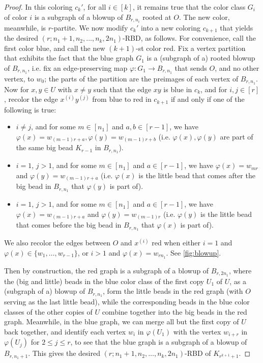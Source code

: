 \documentclass[10pt,a4paper]{amsart}
\numberwithin{theorem}{section}
\renewcommand{\phi}{\varphi}
\renewcommand{\le}{\leqslant}
\begin{document}
\begin{proof}
    In this coloring $c_k'$, for all $i\in [k]$, it remains true that the color class $G_i$ of color $i$ is a subgraph of a blowup of $B_{r,n_i}$ rooted at $O$. The new color, meanwhile, is $r$-partite. We now modify $c_k'$ into a new coloring $c_{k+1}$ that yields the desired $(r;n_1+1,n_2,\dots,n_k,2n_1)$-RBD, as follows. For convenience, call the first color blue, and call the new $(k+1)$-st color red. Fix a vertex partition that exhibits the fact that the blue graph $G_1$ is a (subgraph of a) rooted blowup of $B_{r,n_1}$, i.e. fix an edge-preserving map $\phi: G_1 \to B_{r,n_1}$ that sends $O$, and no other vertex, to $w_0$; the parts of the partition are the preimages of each vertex of $B_{r,n_1}$. Now for $x,y\in U$ with $x\neq y$ such that the edge $xy$ is blue in $c_k$, and for $i,j\in [r]$, recolor the edge $x^{(i)}y^{(j)}$ from blue to red in $c_{k+1}$ if and only if one of the following is true:
    \begin{itemize}
        \item $i\neq j$, and for some $m\in [n_1]$ and $a,b\in [r-1]$, we have $\phi(x)=w_{(m-1)r+a}, \phi(y)=w_{(m-1)r+b}$ (i.e. $\phi(x),\phi(y)$ are part of the same big bead $K_{r-1}$ in $B_{r,n_1}$).
        \item $i=1$, $j>1$, and for some $m\in [n_1]$ and $a\in [r-1]$, we have $\phi(x)=w_{mr}$ and $\phi(y)=w_{(m-1)r+a}$ (i.e. $\phi(x)$ is the little bead that comes after the big bead in $B_{r,n_1}$ that $\phi(y)$ is part of).
        \item $i=1$, $j>1$, and for some $m\in [n_1]$ and $a\in [r-1]$, we have $\phi(x)=w_{(m-1)r+a}$ and $\phi(y)=w_{(m-1)r}$ (i.e. $\phi(y)$ is the little bead that comes before the big bead in $B_{r,n_1}$ that $\phi(x)$ is part of).
    \end{itemize}
    We also recolor the edges between $O$ and $x^{(i)}$ red when either $i=1$ and $\phi(x)\in \{w_1,\dots,w_{r-1}\}$, or $i>1$ and $\phi(x)=w_{rn_1}$. See \cref{fig:blowup}.



    Then by construction, the red graph is a subgraph of a blowup of $B_{r,2n_1}$, where the (big and little) beads in the blue color class of the first copy $U_1$ of $U$, as a (subgraph of a) blowup of $B_{r,n_1}$, form the little beads in the red graph (with $O$ serving as the last little bead), while the corresponding beads in the blue color classes of the other copies of $U$ combine together into the big beads in the red graph. Meanwhile, in the blue graph, we can merge all but the first copy of $U$ back together, and identify each vertex $w_{i}$ in $\phi(U_1)$ with the vertex $w_{i+r}$ in $\phi(U_j)$ for $2\le j\le r$, to see that the blue graph is a subgraph of a blowup of $B_{r,n_1+1}$. This gives the desired $(r;n_1+1,n_2,\dots,n_k,2n_1)$-RBD of $K_{r^{k+1}+1}$.
\end{proof}
\end{document}

